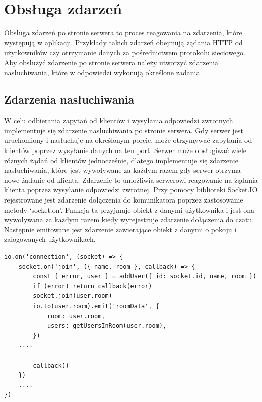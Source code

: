 \section{Obsługa zdarzeń}
Obsługa zdarzeń po stronie serwera to proces reagowania na zdarzenia, które występują w aplikacji. Przykłady takich zdarzeń obejmują żądania HTTP od użytkowników czy otrzymanie danych za pośrednictwem protokołu sieciowego. Aby obsłużyć zdarzenie po stronie serwera należy utworzyć zdarzenia nasłuchiwania, które w odpowiedzi wykonują określone zadania.
\subsection{Zdarzenia nasłuchiwania}
W celu odbierania zapytań od klientów i wysyłania odpowiedzi zwrotnych implementuje się zdarzenie nasłuchiwania po stronie serwera. Gdy serwer jest uruchomiony i nasłuchuje na określonym porcie, może otrzymywać zapytania od klientów poprzez wysyłanie danych na ten port. Serwer może obsługiwać wiele różnych żądań od klientów jednocześnie, dlatego implementuje się zdarzenie nasłuchiwania, które jest wywoływane za każdym razem gdy serwer otrzyma nowe żądanie od klienta. Zdarzenie to umożliwia serwerowi reagowanie na żądania klienta poprzez wysyłanie odpowiedzi zwrotnej. 
Przy pomocy biblioteki Socket.IO rejestrowane jest zdarzenie dołączenia do komunikatora poprzez zastosowanie metody ‘socket.on’. Funkcja ta przyjmuje obiekt z danymi użytkownika i jest ona wywoływana za każdym razem kiedy wyrejestruje zdarzenie dołączenia do czatu. Następnie emitowane jest zdarzenie zawierające obiekt z danymi o pokoju i zalogowanych użytkownikach.
\begin{lstlisting}[caption=Implementacja zdarzenia dołączenia i pobierania danych]
io.on('connection', (socket) => {
    socket.on('join', ({ name, room }, callback) => {
        const { error, user } = addUser({ id: socket.id, name, room })
        if (error) return callback(error)
        socket.join(user.room)
        io.to(user.room).emit('roomData', {
            room: user.room,
            users: getUsersInRoom(user.room),
        })
	....		

        callback()
    })
	....
})
\end{lstlisting}

